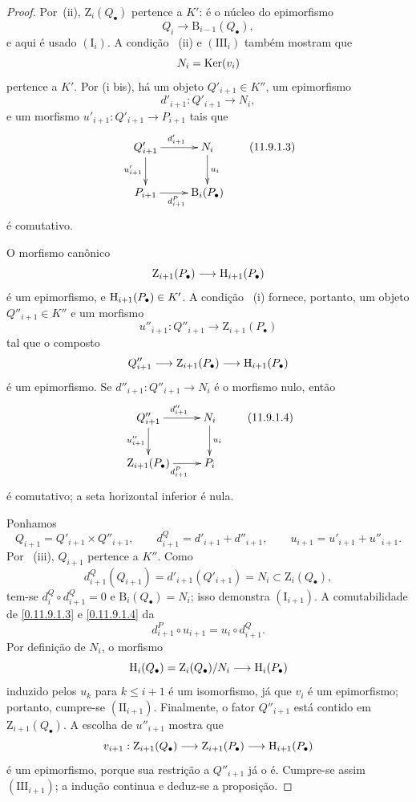 \begin{proof}
Por~(ii), $\mathrm{Z}_i(Q_\bullet)$ pertence a $K'$: é o núcleo do
epimorfismo
\[
  Q_i\longrightarrow\mathrm{B}_{i-1}(Q_\bullet),
\]
e aqui é usado $(\mathrm{I}_i)$.
A condição ~(ii) e $(\mathrm{III}_i)$ também mostram que
\[
  N_i=\operatorname{Ker}(v_i)
\]
pertence a $K'$.
Por (i bis), há um objeto $Q'_{i+1}\in K''$, um epimorfismo
\[
  d'_{i+1}:Q'_{i+1}\longrightarrow N_i,
\]
e um morfismo $u'_{i+1}:Q'_{i+1}\to P_{i+1}$ tais que
\[
  \xymatrix{
    Q'_{i+1}\ar[r]^{d'_{i+1}}\ar[d]_{u'_{i+1}} &
    N_i\ar[d]^{u_i}\\
    P_{i+1}\ar[r]_{d^P_{i+1}} &
    \mathrm{B}_i(P_\bullet)
  }
  \tag{11.9.1.3}\label{0.11.9.1.3}
\]
é comutativo.

O morfismo canônico
\[
  \mathrm{Z}_{i+1}(P_\bullet)
  \longrightarrow
  \mathrm{H}_{i+1}(P_\bullet)
\]
é um epimorfismo, e $\mathrm{H}_{i+1}(P_\bullet)\in K'$.
A condição ~(i) fornece, portanto, um objeto $Q''_{i+1}\in K''$ e um
morfismo
\[
  u''_{i+1}:Q''_{i+1}\longrightarrow
  \mathrm{Z}_{i+1}(P_\bullet)
\]
tal que o composto
\[
  Q''_{i+1}
  \longrightarrow
  \mathrm{Z}_{i+1}(P_\bullet)
  \longrightarrow
  \mathrm{H}_{i+1}(P_\bullet)
\]
é um epimorfismo.
Se $d''_{i+1}:Q''_{i+1}\to N_i$ é o morfismo nulo, então
\[
  \xymatrix{
    Q''_{i+1}\ar[r]^{d''_{i+1}}\ar[d]_{u''_{i+1}} &
    N_i\ar[d]^{u_i}\\
    \mathrm{Z}_{i+1}(P_\bullet)\ar[r]_{d^P_{i+1}} &
    P_i
  }
  \tag{11.9.1.4}\label{0.11.9.1.4}
\]
é comutativo; a seta horizontal inferior é nula.

Ponhamos
\[
  Q_{i+1}=Q'_{i+1}\times Q''_{i+1},
  \qquad
  d^Q_{i+1}=d'_{i+1}+d''_{i+1},
  \qquad
  u_{i+1}=u'_{i+1}+u''_{i+1}.
\]
Por ~(iii), $Q_{i+1}$ pertence a $K''$.
Como
\[
  d^Q_{i+1}(Q_{i+1})
  =
  d'_{i+1}(Q'_{i+1})
  =
  N_i
  \subset
  \mathrm{Z}_i(Q_\bullet),
\]
tem-se
$d^Q_i\circ d^Q_{i+1}=0$ e
$\mathrm{B}_i(Q_\bullet)=N_i$; isso demonstra
$(\mathrm{I}_{i+1})$.
A comutabilidade de \eqref{0.11.9.1.3} e
\eqref{0.11.9.1.4} da
\[
  d^P_{i+1}\circ u_{i+1}
  =
  u_i\circ d^Q_{i+1}.
\]
Por definição de $N_i$, o morfismo
\[
  \mathrm{H}_i(Q_\bullet)
  =
  \mathrm{Z}_i(Q_\bullet)/N_i
  \longrightarrow
  \mathrm{H}_i(P_\bullet)
\]
induzido pelos $u_k$ para $k\leq i+1$ é um isomorfismo, já que $v_i$ é
um epimorfismo; portanto, cumpre-se $(\mathrm{II}_{i+1})$.
Finalmente, o fator $Q''_{i+1}$ está contido em
$\mathrm{Z}_{i+1}(Q_\bullet)$.
A escolha de $u''_{i+1}$ mostra que
\[
  v_{i+1}:
  \mathrm{Z}_{i+1}(Q_\bullet)
  \longrightarrow
  \mathrm{Z}_{i+1}(P_\bullet)
  \longrightarrow
  \mathrm{H}_{i+1}(P_\bullet)
\]
é um epimorfismo, porque sua restrição a $Q''_{i+1}$ já o
é.
Cumpre-se assim $(\mathrm{III}_{i+1})$; a indução continua e deduz-se a
proposição.
\end{proof}

